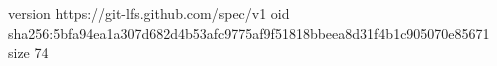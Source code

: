 version https://git-lfs.github.com/spec/v1
oid sha256:5bfa94ea1a307d682d4b53afc9775af9f51818bbeea8d31f4b1c905070e85671
size 74
